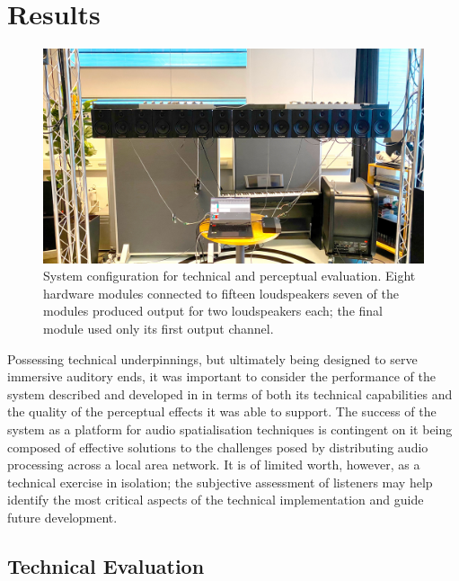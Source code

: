 \section{Results}\label{sec:results}

\begin{figure}[ht]
    \centering
    \includegraphics[width=\textwidth]{figures/eval-setup}
    \caption{
        System configuration for technical and perceptual evaluation.
        Eight hardware modules connected to fifteen loudspeakers \textemdash{}
        seven of the modules produced output for two loudspeakers each; the
        final module used only its first output channel.
    }
    \label{fig:eval-setup}
\end{figure}

Possessing technical underpinnings, but ultimately being designed to
serve immersive auditory ends, it was important to consider the performance of
the system described and developed in  in terms of
both its technical capabilities and the quality of the perceptual effects it
was able to support.
The success of the system as a platform for audio spatialisation techniques is
contingent on it being composed of effective solutions to the challenges posed
by distributing audio processing across a local area network.
It is of limited worth, however, as a technical exercise in isolation;
the subjective assessment of listeners may help identify the most critical
aspects of the technical implementation and guide future development.

\subsection{Technical Evaluation}\label{subsec:technical-evaluation}

